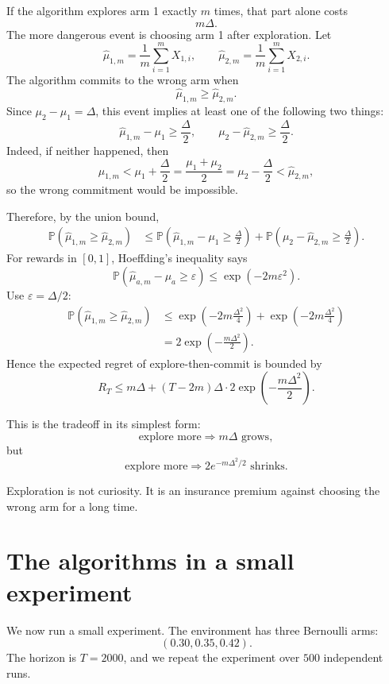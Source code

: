 \documentclass[en,nofont,11pt]{elegantbook}
\newcommand{\Prob}{\mathbb{P}}
\begin{document}
If the algorithm explores arm 1 exactly $m$ times, that part alone costs
\[
m\Delta.
\]
The more dangerous event is choosing arm 1 after exploration.  Let
\[
\widehat{\mu}_{1,m}
=
\frac1m\sum_{i=1}^m X_{1,i},
\qquad
\widehat{\mu}_{2,m}
=
\frac1m\sum_{i=1}^m X_{2,i}.
\]
The algorithm commits to the wrong arm when
\[
\widehat{\mu}_{1,m}\ge \widehat{\mu}_{2,m}.
\]
Since $\mu_2-\mu_1=\Delta$, this event implies at least one of the following two things:
\[
\widehat{\mu}_{1,m}-\mu_1\ge \frac{\Delta}{2},
\qquad
\mu_2-\widehat{\mu}_{2,m}\ge \frac{\Delta}{2}.
\]
Indeed, if neither happened, then
\[
\widehat{\mu}_{1,m}
<
\mu_1+\frac{\Delta}{2}
=
\frac{\mu_1+\mu_2}{2}
=
\mu_2-\frac{\Delta}{2}
<
\widehat{\mu}_{2,m},
\]
so the wrong commitment would be impossible.

Therefore, by the union bound,
\[
\begin{aligned}
\Prob(\widehat{\mu}_{1,m}\ge \widehat{\mu}_{2,m})
&\le
\Prob\left(\widehat{\mu}_{1,m}-\mu_1\ge \frac{\Delta}{2}\right)
+
\Prob\left(\mu_2-\widehat{\mu}_{2,m}\ge \frac{\Delta}{2}\right).
\end{aligned}
\]
For rewards in $[0,1]$, Hoeffding's inequality says
\[
\Prob(\widehat{\mu}_{a,m}-\mu_a\ge \varepsilon)
\le
\exp(-2m\varepsilon^2).
\]
Use $\varepsilon=\Delta/2$:
\[
\begin{aligned}
\Prob(\widehat{\mu}_{1,m}\ge \widehat{\mu}_{2,m})
&\le
\exp\left(-2m\frac{\Delta^2}{4}\right)
+
\exp\left(-2m\frac{\Delta^2}{4}\right) \\[0.3em]
&=
2\exp\left(-\frac{m\Delta^2}{2}\right).
\end{aligned}
\]
Hence the expected regret of explore-then-commit is bounded by
\[
\boxed{
R_T
\le
m\Delta
+
(T-2m)\Delta
\cdot
2\exp\left(-\frac{m\Delta^2}{2}\right).
}
\]

This is the tradeoff in its simplest form:
\[
\text{explore more} \Longrightarrow m\Delta \text{ grows},
\]
but
\[
\text{explore more} \Longrightarrow
2e^{-m\Delta^2/2} \text{ shrinks}.
\]

\begin{idea}
Exploration is not curiosity.  It is an insurance premium against choosing the wrong arm for a long time.
\end{idea}

\chapter{The algorithms in a small experiment}

We now run a small experiment.  The environment has three Bernoulli arms:
\[
(0.30,0.35,0.42).
\]
The horizon is $T=2000$, and we repeat the experiment over $500$ independent runs.
\end{document}

